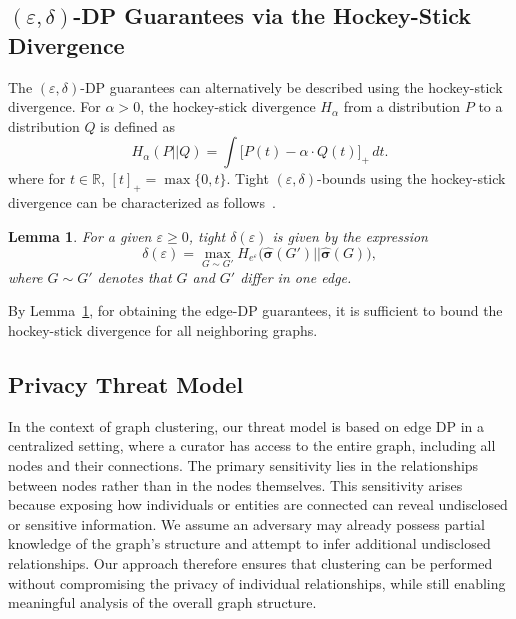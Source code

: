 \documentclass[11pt]{article}
\theoremstyle{plain}
\newtheorem{lemma}{Lemma}[section]
\theoremstyle{definition}
\theoremstyle{remark}
\newcommand{\veps}{{\varepsilon}}
\begin{document}
\subsection{$(\veps,\delta)$-DP Guarantees via the Hockey-Stick Divergence}

The $(\veps,\delta)$-DP guarantees can alternatively be described using the hockey-stick divergence. For $\alpha>0$, the hockey-stick divergence $H_{\alpha}$ from a distribution $P$ to a distribution $Q$ is defined as
$$
H_\alpha(P||Q) = \int \big[P(t) - \alpha \cdot Q(t)\big]_{+} \, d t.
$$
where for $t \in \mathbb{R}$, $[t]_+ = \max\{0,t\}$. 
Tight $(\veps,\delta)$-bounds using the hockey-stick divergence can be characterized as follows~\citep[see Lemma 5,][]{zhu2022optimal}.
\begin{lemma} \label{lem:zhu_lemma5}
For a given $\veps\geq0$, 
tight $\delta(\veps)$ is given by the expression
$$
\delta(\veps) = \max_{G \sim G'} H_{e^\veps}\big(\hat{\bm{\sigma}}(G')||\hat{\bm{\sigma}}(G)\big),
$$ 
where $G \sim G'$ denotes that $G$ and $G'$ differ in one edge.
\end{lemma}
By Lemma~\ref{lem:zhu_lemma5}, for obtaining the edge-DP guarantees,  it is sufficient to bound the hockey-stick divergence for all neighboring graphs. 





\subsection{Privacy Threat Model} 

In the context of graph clustering, our threat model is based on edge DP in a centralized setting, where a curator has access to the entire graph, including all nodes and their connections. The primary sensitivity lies in the relationships between nodes rather than in the nodes themselves. This sensitivity arises because exposing how individuals or entities are connected can reveal undisclosed or sensitive information. We assume an adversary may already possess partial knowledge of the graph’s structure and attempt to infer additional undisclosed relationships. Our approach therefore ensures that clustering can be performed without compromising the privacy of individual relationships, while still enabling meaningful analysis of the overall graph structure.
\end{document}
